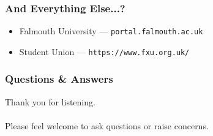 \begin{frame}
	\frametitle{And Everything Else...?}	
	\begin{itemize}
		\item Falmouth University --- \texttt{portal.falmouth.ac.uk}
		\item Student Union --- \texttt{https://www.fxu.org.uk/}
	\end{itemize}
\end{frame}

\begin{frame}
	\frametitle{Questions \& Answers}	
	\begin{center}
		Thank you for listening. 
		\\~\\
		Please feel welcome to ask questions or raise concerns.
	\end{center}
\end{frame}


